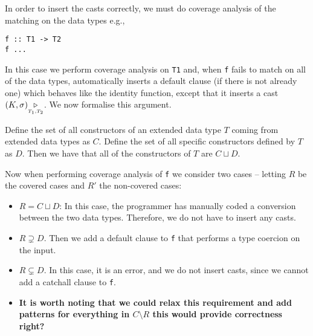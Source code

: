 In order to insert the casts correctly, we must do coverage analysis of the
matching on the data types e.g.,
\begin{lstlisting}
f :: T1 -> T2
f ...
\end{lstlisting}
In this case we perform coverage analysis on {\tt T1} and, when {\tt f} fails to
match on all of the data types, automatically inserts a default clause (if
there is not already one) which behaves like the identity function, except
that it inserts a cast $(K,\sigma) {\underset{{\scriptscriptstyle T_1,T_2}}{\triangleright}}$. We
now formalise this argument.

Define the set of all constructors of an extended data type $T$ 
coming from extended data types as $C$. Define the set of all specific
constructors defined by $T$ as $D$. Then we have that all of the
constructors of $T$ are $C \sqcup D$.

Now when performing coverage analysis of {\tt f} we consider two cases --
letting $R$ be the covered cases and $R'$ the non-covered cases:
\begin{itemize}
  \item $R = C \sqcup D$: In this case, the programmer has manually
    coded a conversion between the two data types. Therefore, we do not
    have to insert any casts.
  \item $R \supsetneq D$. Then we add a default clause to {\tt f} that performs
    a type coercion on the input.
  \item $R \subsetneq D$. In this case, it is an error, and we do not
    insert casts, since we cannot add a catchall clause to {\tt f}.
  \item {\bf It is
    worth noting that we could relax this requirement and add patterns for
  everything in $C \setminus R$ this would provide correctness right?}
\end{itemize}































































